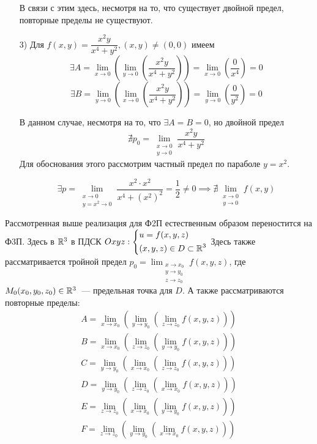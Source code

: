\documentclass[../../main.tex]{subfiles}
\begin{document}
\begin{itemize}
	В связи с этим здесь, несмотря на то, что существует двойной
	предел, повторные пределы не существуют.
	
	\item[3)] Для $f(x, y) = \dfrac{x^2 y}{x^4 + y^2}, (x, y) \ne (0, 0)$
	имеем \[\exists A = \displaystyle \lim_{x \to 0}
	{(\lim_{y \to 0}{( \dfrac{x^2 y}{x^4 + y^2} )})} =
	\lim_{x \to 0}{\left(\dfrac{0}{x^4}\right)} = 0\]
	\[\exists B = \displaystyle \lim_{y \to 0}
	{(\lim_{x \to 0}{( \dfrac{x^2 y}{x^4 + y^2} )})} =
	\lim_{y \to 0}{\left(\dfrac{0}{y^2}\right)} = 0\]
	
	В данном случае, несмотря на то, что $\exists A = B = 0$, но
	двойной предел \[\nexists p_0 = \displaystyle 
	\lim_{\substack{x \to 0 \\ y \to 0}}{\dfrac{x^2 y}{x^4 + y^2}}\]	
	Для обоснования этого рассмотрим частный предел по параболе
	$y = x^2$.
	
	\[\exists p = \lim_{\substack{x \to 0 \\ y = x^2 \to 0}}
	{\dfrac{x^2 \cdot x^2}{x^4 + (x^2)^2}} = \dfrac{1}{2} \ne 0
	\implies \nexists \lim_{\substack{x \to 0 \\ y \to 0}}{f(x, y)}\]
\end{itemize}


Рассмотренная выше реализация для Ф2П естественным образом
переностится на Ф3П. Здесь в $\mathbb{R}^3$ в ПДСК $Oxyz:
\left\{\begin{aligned}
	&u = f(x, y, z) \\
	&(x, y, z) \in D \subset \mathbb{R}^3	\end{aligned}\right.$
	Здесь также рассматривается тройной предел
	$p_0 = \displaystyle \lim_{\substack{x \to x_0 \\ y \to y_0 \\ z \to z_0}}
{f(x, y, z)}$, где $M_0(x_0, y_0, z_0) \in \mathbb{R}^3$~--- предельная точка для $D$.
А также рассматриваются повторные пределы:
\begin{gather*}
	A = \lim_{x \to x_0}{(\lim_{y \to y_0}{(\lim_{z \to z_0}{f(x, y, z)})})} \\
	B = \lim_{x \to x_0}{(\lim_{z \to z_0}{(\lim_{y \to y_0}{f(x, y, z)})})} \\
	C = \lim_{y \to y_0}{(\lim_{x \to x_0}{(\lim_{z \to z_0}{f(x, y, z)})})} \\
	D = \lim_{y \to y_0}{(\lim_{z \to z_0}{(\lim_{x \to x_0}{f(x, y, z)})})} \\
	E = \lim_{z \to z_0}{(\lim_{x \to x_0}{(\lim_{y \to y_0}{f(x, y, z)})})} \\
	F = \lim_{z \to z_0}{(\lim_{y \to y_0}{(\lim_{x \to x_0}{f(x, y, z)})})}
\end{gather*}
	
\end{document}
